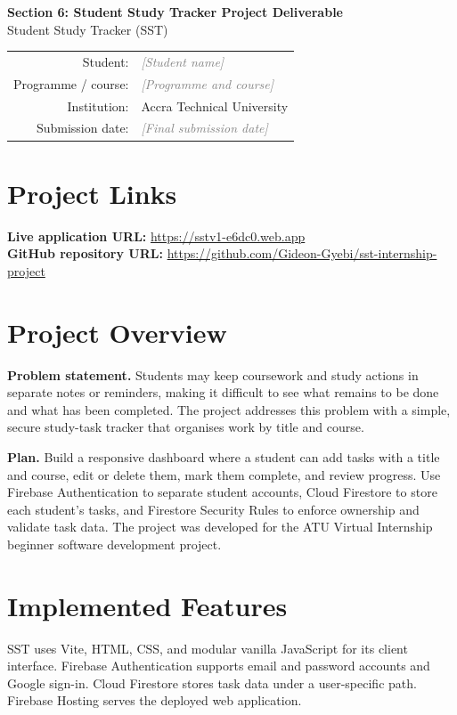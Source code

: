 \documentclass[11pt,a4paper]{article}
\newcommand{\placeholder}[1]{\textcolor{gray}{\textit{[#1]}}}
\begin{document}
\begin{center}
  {\LARGE\bfseries Section 6: Student Study Tracker Project Deliverable}\\[5pt]
  {\large Student Study Tracker (SST)}\\[9pt]
  \begin{tabular}{rl}
    Student: & \placeholder{Student name} \\
    Programme / course: & \placeholder{Programme and course} \\
    Institution: & Accra Technical University \\
    Submission date: & \placeholder{Final submission date}
  \end{tabular}
\end{center}

\section*{Project Links}
\textbf{Live application URL:} \url{https://sstv1-e6dc0.web.app}\\
\textbf{GitHub repository URL:} \url{https://github.com/Gideon-Gyebi/sst-internship-project}

\section{Project Overview}

\textbf{Problem statement.} Students may keep coursework and study actions in separate notes or reminders, making it difficult to see what remains to be done and what has been completed. The project addresses this problem with a simple, secure study-task tracker that organises work by title and course.

\textbf{Plan.} Build a responsive dashboard where a student can add tasks with a title and course, edit or delete them, mark them complete, and review progress. Use Firebase Authentication to separate student accounts, Cloud Firestore to store each student's tasks, and Firestore Security Rules to enforce ownership and validate task data. The project was developed for the ATU Virtual Internship beginner software development project.

\section{Implemented Features}

SST uses Vite, HTML, CSS, and modular vanilla JavaScript for its client interface. Firebase Authentication supports email and password accounts and Google sign-in. Cloud Firestore stores task data under a user-specific path. Firebase Hosting serves the deployed web application.
\end{document}
